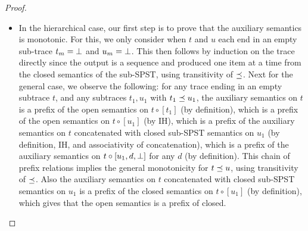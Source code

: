 \begin{proof}
\begin{itemize}
  \item
  In the hierarchical case,
  our first step is to prove that the auxiliary semantics
  is monotonic.
  For this, we only consider when $t$ and $u$ each end in an empty sub-trace
  $t_m = \bot$ and $u_m = \bot$.
  This then follows by induction on the trace directly
  since the output is a sequence and produced one item at a time
  from the closed semantics of the sub-SPST,
  using transitivity of $\preceq$.
  Next for the general case,
  we observe the following:
  for any trace ending in an empty subtrace $t$,
  and any subtraces $t_1, u_1$ with $t_1 \preceq u_1$,
  the auxiliary semantics on $t$
  is a prefix of the open semantics on $t \circ [t_1]$
  (by definition),
  which is a prefix of the open semantics on $t \circ [u_1]$
  (by IH),
  which is a prefix of the auxiliary semantics on $t$
  concatenated with closed sub-SPST semantics on $u_1$
  (by definition, IH, and associativity of concatenation),
  which is a prefix of the auxiliary semantics
  on $t \circ [u_1, d, \bot{}]$ for any $d$
  (by definition).
  This chain of prefix relations
  implies the general monotonicity for $t \preceq u$,
  using transitivity of $\preceq$.
  Also the auxiliary semantics on $t$ concatenated with closed sub-SPST
  semantics on $u_1$ is a prefix of
  the closed semantics on $t \circ [u_1]$
  (by definition),
  which gives that the open semantics is a prefix of closed.


\end{itemize}
\end{proof}
